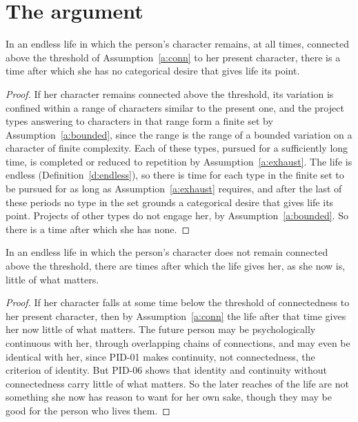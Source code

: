 \documentclass{situationist-preprint}
\begin{document}
\section{The argument}

\begin{lemma}\label{l:first}
In an endless life in which the person's character remains, at all times, connected above the threshold of Assumption~\ref{a:conn} to her present character, there is a time after which she has no categorical desire that gives life its point.
\end{lemma}

\begin{proof}
If her character remains connected above the threshold, its variation is confined within a range of characters similar to the present one, and the project types answering to characters in that range form a finite set by Assumption~\ref{a:bounded}, since the range is the range of a bounded variation on a character of finite complexity. Each of these types, pursued for a sufficiently long time, is completed or reduced to repetition by Assumption~\ref{a:exhaust}. The life is endless (Definition~\ref{d:endless}), so there is time for each type in the finite set to be pursued for as long as Assumption~\ref{a:exhaust} requires, and after the last of these periods no type in the set grounds a categorical desire that gives life its point. Projects of other types do not engage her, by Assumption~\ref{a:bounded}. So there is a time after which she has none.
\end{proof}

\begin{lemma}\label{l:second}
In an endless life in which the person's character does not remain connected above the threshold, there are times after which the life gives her, as she now is, little of what matters.
\end{lemma}

\begin{proof}
If her character falls at some time below the threshold of connectedness to her present character, then by Assumption~\ref{a:conn} the life after that time gives her now little of what matters. The future person may be psychologically continuous with her, through overlapping chains of connections, and may even be identical with her, since PID-01 makes continuity, not connectedness, the criterion of identity. But PID-06 shows that identity and continuity without connectedness carry little of what matters. So the later reaches of the life are not something she now has reason to want for her own sake, though they may be good for the person who lives them.
\end{proof}
\end{document}
